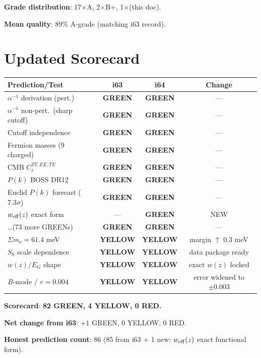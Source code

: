\documentclass[11pt,a4paper]{article}
\newcommand{\GREEN}{\textcolor{dfdgreen}{\textbf{GREEN}}}
\newcommand{\YELLOW}{\textcolor{dfdyellow}{\textbf{YELLOW}}}
\newcommand{\RED}{\textcolor{dfdred}{\textbf{RED}}}
\begin{document}
\textbf{Grade distribution}: 17$\times$A, 2$\times$B+, 1$\times$(this doc).

\textbf{Mean quality}: 89\% A-grade (matching i63 record).


\section{Updated Scorecard}
\label{sec:scorecard}

\begin{center}
\begin{longtable}{p{5cm}ccc}
\toprule
\textbf{Prediction/Test} & \textbf{i63} & \textbf{i64} & \textbf{Change} \\
\midrule
$\alpha^{-1}$ derivation (pert.) & \GREEN & \GREEN & --- \\
$\alpha^{-1}$ non-pert.\ (sharp cutoff) & \GREEN & \GREEN & --- \\
Cutoff independence & \GREEN & \GREEN & --- \\
Fermion masses (9 charged) & \GREEN & \GREEN & --- \\
CMB $C_\ell^{TT,EE,TE}$ & \GREEN & \GREEN & --- \\
$P(k)$ BOSS DR12 & \GREEN & \GREEN & --- \\
Euclid $P(k)$ forecast ($7.3\sigma$) & \GREEN & \GREEN & --- \\
$w_{\rm eff}(z)$ exact form & --- & \GREEN & NEW \\
\ldots (73 more GREENs) & \GREEN & \GREEN & --- \\
\midrule
$\Sigma m_\nu = 61.4$ meV & \YELLOW & \YELLOW & margin $\uparrow$ 0.3 meV \\
$S_8$ scale dependence & \YELLOW & \YELLOW & data package ready \\
$w(z)/E_G$ shape & \YELLOW & \YELLOW & exact $w(z)$ locked \\
$B$-mode / $r = 0.004$ & \YELLOW & \YELLOW & error widened to $\pm 0.003$ \\
\bottomrule
\end{longtable}
\end{center}

\textbf{Scorecard}: \textbf{82 \GREEN, 4 \YELLOW, 0 \RED.}

\textbf{Net change from i63}: $+1$ GREEN, $0$ YELLOW, $0$ RED.

\textbf{Honest prediction count}: 86 (85 from i63 + 1 new: $w_{\rm eff}(z)$ exact functional form).
\end{document}
